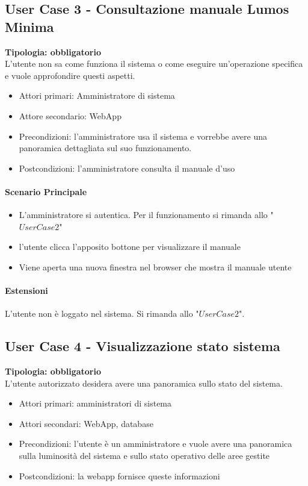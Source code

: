 \documentclass[12pt]{article}
\begin{document}
\subsection{User Case 3 - Consultazione manuale Lumos Minima}
\textbf{Tipologia: obbligatorio}\\
L'utente non sa come funziona il sistema o come eseguire un'operazione specifica e vuole approfondire questi aspetti.
\begin{itemize}
	\item Attori primari: Amministratore di sistema
	\item Attore secondario: WebApp
	\item Precondizioni: l'amministratore usa il sistema e vorrebbe avere una panoramica dettagliata sul suo funzionamento.
	\item Postcondizioni: l'amministratore consulta il manuale d'uso
\end{itemize}
\paragraph{Scenario Principale}
\begin{itemize}
	\item L'amministratore si autentica. Per il funzionamento si rimanda allo "$User Case 2$"
	\item l'utente clicca l'apposito bottone per visualizzare il manuale
	\item Viene aperta una nuova finestra nel browser che mostra il manuale utente
\end{itemize}

\paragraph{Estensioni} L'utente non è loggato nel sistema. Si rimanda allo "$User Case 2$".

\subsection{User Case 4 - Visualizzazione stato sistema}
\textbf{Tipologia: obbligatorio} \\
L'utente autorizzato desidera avere una panoramica sullo stato del sistema.
\begin{itemize}
	\item Attori primari: amministratori di sistema
	\item Attori secondari: WebApp, database
	\item Precondizioni: l'utente è un amministratore e vuole avere una panoramica sulla luminosità del sistema e sullo stato operativo delle aree gestite
	\item Postcondizioni: la webapp fornisce queste informazioni
\end{itemize}
\end{document}
